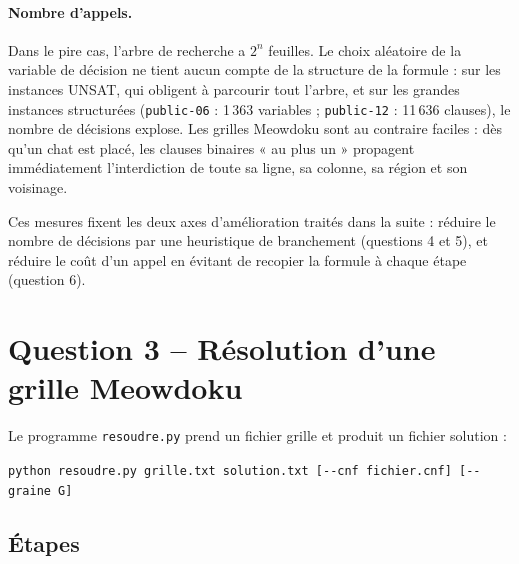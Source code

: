 \documentclass[11pt,a4paper]{article}
\begin{document}
\paragraph{Nombre d'appels.} Dans le pire cas, l'arbre de recherche a $2^n$ feuilles. Le choix
aléatoire de la variable de décision ne tient aucun compte de la structure de la formule : sur les
instances UNSAT, qui obligent à parcourir tout l'arbre, et sur les grandes instances structurées
(\texttt{public-06} : 1\,363 variables ; \texttt{public-12} : 11\,636 clauses), le nombre de décisions explose. Les grilles Meowdoku sont au
contraire faciles : dès qu'un chat est placé, les clauses binaires « au plus un » propagent
immédiatement l'interdiction de toute sa ligne, sa colonne, sa région et son voisinage.

Ces mesures fixent les deux axes d'amélioration traités dans la suite : réduire le nombre de
décisions par une heuristique de branchement (questions 4 et 5), et réduire le coût d'un appel
en évitant de recopier la formule à chaque étape (question 6).

\section{Question 3 -- Résolution d'une grille Meowdoku}

Le programme \texttt{resoudre.py} prend un fichier grille et produit un fichier solution :
\begin{center}
\texttt{python resoudre.py grille.txt solution.txt [-{}-cnf fichier.cnf] [-{}-graine G]}
\end{center}

\subsection{Étapes}
\end{document}

